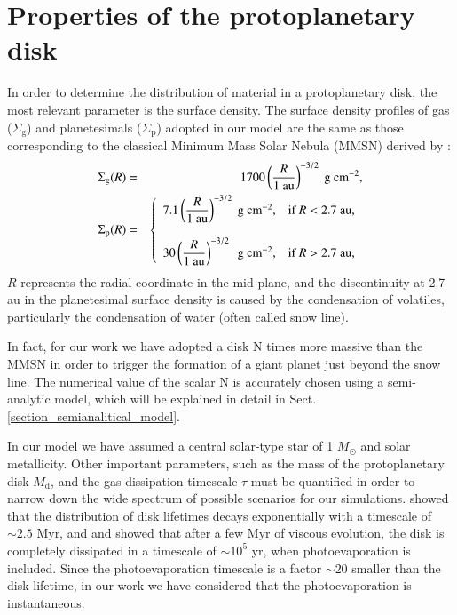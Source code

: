 \documentclass{aa}
\begin{document}
\section{Properties of the protoplanetary disk}
\label{section_protoplanetary_disk}

In order to determine the distribution of material in a protoplanetary disk, the most relevant parameter is the surface density.
The surface density profiles of gas ($\Sigma_{\text{g}}$) and planetesimals ($\Sigma_{\text{p}}$) adopted in our model are the same
as those corresponding to the classical Minimum Mass Solar Nebula (MMSN) derived by \citet{Hayashi1981}:
\begin{eqnarray}
\Sigma_{\text{g}}(R) &=& 1700 \left(\frac{R}{1~\text{au}} \right)^{-3/2}~\text{g}~\text{cm}^{-2}, \\
\Sigma_{\text{p}}(R) &=& \left \lbrace \begin{array}{ll}
7.1 \left(\displaystyle{\frac{R}{1~\text{au}}}\right)^{-3/2}~\text{g}~\text{cm}^{-2}, & \mbox{if $R < 2.7$~au},\\
\\
30 \left(\displaystyle{\frac{R}{1~\text{au}}}\right)^{-3/2}~\text{\
g}~\text{cm}^{-2}, & \mbox{if $R > 2.7$~au},
\end{array}
\right.
\label{e1}
\end{eqnarray}
 $R$ represents the radial coordinate in the mid-plane, and the discontinuity at 2.7 au in the planetesimal surface density is caused by the condensation of volatiles, particularly the condensation of water (often called snow line). 

In fact, for our work we have adopted a disk N times more massive than the MMSN in order to trigger the formation of a giant planet just beyond the snow line. The numerical value of the scalar N is accurately chosen using a semi-analytic model, which will be explained in detail in Sect. \ref{section_semianalitical_model}.

In our model we have assumed a central solar-type star of 1 $M_{\odot}$ and solar metallicity. Other important parameters, such as the mass
of the protoplanetary disk $M_{\text{d}}$, and the gas dissipation timescale $\tau$ must be quantified in order to narrow
down the wide spectrum of possible scenarios for our simulations. \citet{Mamajek2009} showed that the distribution
of disk lifetimes decays exponentially with a
timescale of $\sim 2.5$ Myr, and \citet{Alexander2006} and \citet{Armitage2010} showed that after a few Myr of viscous evolution, the disk is completely dissipated in a timescale of $\sim 10^5$ yr, when photoevaporation is included. Since the photoevaporation timescale is a factor $\sim 20$ smaller than the disk lifetime, in our work we have considered that the photoevaporation is instantaneous.
\end{document}
